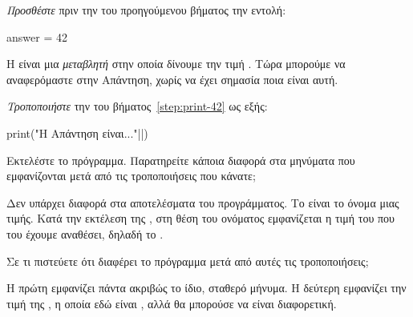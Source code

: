 \documentclass[a4paper,11pt,oneside]{book}
\begin{document}
\begin{step}
\label{step:answer-assign}

\emph{Προσθέστε} πριν την  του προηγούμενου βήματος την εντολή:

\begin{pynew}
answer = 42
\end{pynew}

Η  είναι μια \emph{μεταβλητή} στην οποία δίνουμε την τιμή . Tώρα μπορούμε να αναφερόμαστε στην Απάντηση, χωρίς να έχει σημασία ποια είναι αυτή.

\emph{Τροποποιήστε} την  του βήματος~\ref{step:print-42} ως εξής:

\begin{pyplain}
print("Η Απάντηση είναι..."||)
\end{pyplain}

Εκτελέστε το πρόγραμμα. Παρατηρείτε κάποια διαφορά στα μηνύματα που εμφανίζονται μετά από τις τροποποιήσεις που κάνατε;

\begin{answer}[]
Δεν υπάρχει διαφορά στα αποτελέσματα του προγράμματος.%
 Το  είναι το όνομα μιας τιμής. 
Κατά την εκτέλεση της , στη θέση του ονόματος  εμφανίζεται η τιμή του που του έχουμε αναθέσει, δηλαδή το .
\end{answer}

Σε τι πιστεύετε ότι διαφέρει το πρόγραμμα μετά από αυτές τις τροποποιήσεις;

\clearpage
\begin{answer}
Η πρώτη  εμφανίζει πάντα ακριβώς το ίδιο, σταθερό μήνυμα. Η δεύτερη  εμφανίζει την τιμή της , η οποία εδώ είναι , αλλά θα μπορούσε να είναι διαφορετική.
\end{answer}


\end{step}
\end{document}

